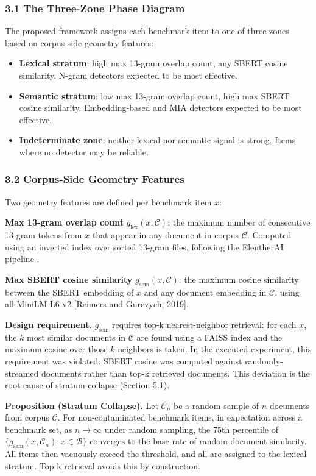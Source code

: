 
\subsubsection{3.1 The Three-Zone Phase Diagram}

The proposed framework assigns each benchmark item to one of three zones based on corpus-side geometry features:

\begin{itemize}
\item \textbf{Lexical stratum}: high max 13-gram overlap count, any SBERT cosine similarity. N-gram detectors expected to be most effective.
\item \textbf{Semantic stratum}: low max 13-gram overlap count, high max SBERT cosine similarity. Embedding-based and MIA detectors expected to be most effective.
\item \textbf{Indeterminate zone}: neither lexical nor semantic signal is strong. Items where no detector may be reliable.
\end{itemize}

\subsubsection{3.2 Corpus-Side Geometry Features}

Two geometry features are defined per benchmark item $x$:

\textbf{Max 13-gram overlap count} $g_{\text{lex}}(x, \mathcal{C})$: the maximum number of consecutive 13-gram tokens from $x$ that appear in any document in corpus $\mathcal{C}$. Computed using an inverted index over sorted 13-gram files, following the EleutherAI pipeline \citep{Gaoetal2021}.

\textbf{Max SBERT cosine similarity} $g_{\text{sem}}(x, \mathcal{C})$: the maximum cosine similarity between the SBERT embedding of $x$ and any document embedding in $\mathcal{C}$, using all-MiniLM-L6-v2 [Reimers and Gurevych, 2019].

\textbf{Design requirement.} $g_{\text{sem}}$ requires top-k nearest-neighbor retrieval: for each $x$, the $k$ most similar documents in $\mathcal{C}$ are found using a FAISS index \citep{Johnsonetal2021} and the maximum cosine over those $k$ neighbors is taken. In the executed experiment, this requirement was violated: SBERT cosine was computed against randomly-streamed documents rather than top-k retrieved documents. This deviation is the root cause of stratum collapse (Section 5.1).

\textbf{Proposition (Stratum Collapse).} Let $\mathcal{C}_n$ be a random sample of $n$ documents from corpus $\mathcal{C}$. For non-contaminated benchmark items, in expectation across a benchmark set, as $n \to \infty$ under random sampling, the 75th percentile of $\{g_{\text{sem}}(x, \mathcal{C}_n) : x \in \mathcal{B}\}$ converges to the base rate of random document similarity. All items then vacuously exceed the threshold, and all are assigned to the lexical stratum. Top-k retrieval avoids this by construction.

